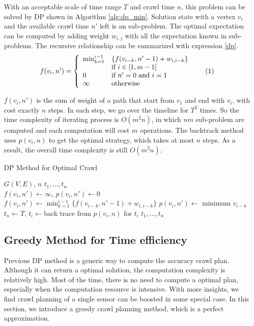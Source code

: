 \documentclass[conference]{IEEEtran}
\newcommand\numberthis{\addtocounter{equation}{1}\tag{\theequation}}
\begin{document}
With an acceptable scale of time range $T$ and crawl time $n$, this problem can be solved by DP shown in Algorithm \ref{alg:dp_min}. 
Solution state with a vertex $v_i$ and the available crawl time $n'$ left is an sub-problem. 
The optimal expectation can be computed by adding weight $w_{i,j}$ with all the expectation known in sub-problems. 
The recursive relationship can be summarized with expression \eqref{dp}.
\[
f(v_i, n')=\left\{
\begin{array}{ll}
\min_{k=1}^{i-1} & \{f(v_{i-k}, n'-1)+w_{i,i-k}\}\\
& \text{if } i\in[1, m-1]\\
0 & \text{if } n'=0 \text{ and } i=1\\
\infty & \text{otherwise}
\end{array}\numberthis \label{dp}
\right.
\]

$f(v_i,n')$ is the sum of weight of a path that start from $v_1$ and end with $v_i$, with cost exactly $n$ steps. In each step, we go over the timeline for $T^2$ times.
So the time complexity of iterating process is $O(m^2n)$, in which $nm$ sub-problem are computed and each computation will cost $m$ operations. 
The backtrack method uses $p(v_i, n)$ to get the optimal strategy, which takes at most $n$ steps. 
As a result, the overall time complexity is still $O(m^2n)$.
\begin{algorithm}
\caption{DP Method for Optimal Crawl}
\label{alg:dp_min}
\begin{algorithmic}[1]
	\renewcommand{\algorithmicrequire}{\textbf{Input:}}
	\renewcommand{\algorithmicensure}{\textbf{Output:}}
	\REQUIRE $G(V,E)$, $n$
	\ENSURE  $t_1,\ldots,t_n$
	\\
	\STATE $f(v_i,n') \gets \infty$, $p(v_i,n')\gets 0$
	\STATE $f(v_i,n')\gets\min_{k=1}^{i-1}\{f(v_{i-k}, n'-1)+w_{i,i-k}\}$
	\STATE $p(v_i,n')\gets$ minimum $v_{i-k}$
	\ENDFOR
	\ENDFOR
	\STATE $t_n\gets T$, $t_i\gets$back trace from $p(v_i, n)$ for $t_i$
	\RETURN $t_1,\ldots,t_n$
\end{algorithmic}
\end{algorithm}

\subsection{Greedy Method for Time efficiency}

Previous DP method is a generic way to compute the accuracy crawl plan. 
Although it can return a optimal solution, the computation complexity is relatively high.
Most of the time, there is no need to compute a optimal plan, especially when the computation resource is intensive.
With more insights, we find crawl planning of a single sensor can be boosted in some special case.
In this section, we introduce a greedy crawl planning method, which is a perfect approximation.
\end{document}
